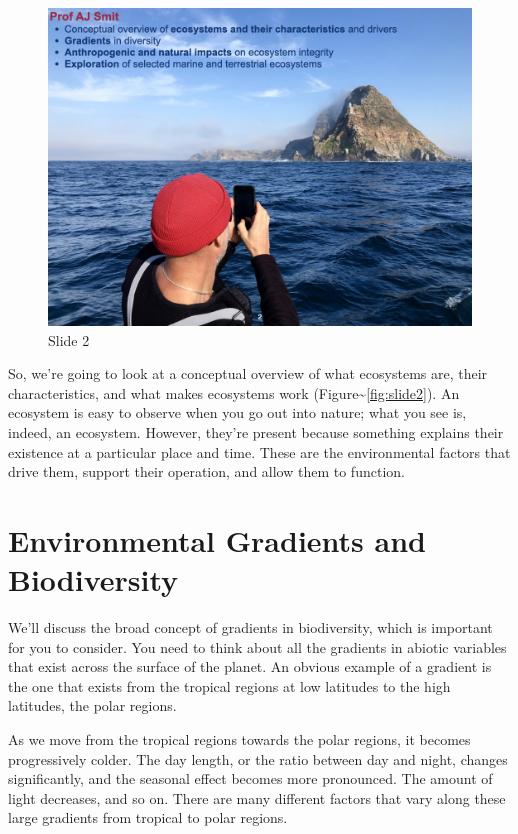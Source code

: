 \documentclass[
  10pt,
]{book}
\begin{document}
\begin{figure}[ht]
\centering
\includegraphics[width=0.8\linewidth]{../images/BDC334/BDC334-002.jpeg}
\caption*{Slide 2}\label{fig:slide2}
\end{figure}

So, we're going to look at a conceptual overview of what ecosystems are,
their characteristics, and what makes ecosystems work
(Figure\textasciitilde{}\autoref{fig:slide2}). An ecosystem is easy to
observe when you go out into nature; what you see is, indeed, an
ecosystem. However, they're present because something explains their
existence at a particular place and time. These are the environmental
factors that drive them, support their operation, and allow them to
function.

\section{Environmental Gradients and
Biodiversity}\label{environmental-gradients-and-biodiversity}

We'll discuss the broad concept of gradients in biodiversity, which is
important for you to consider. You need to think about all the gradients
in abiotic variables that exist across the surface of the planet. An
obvious example of a gradient is the one that exists from the tropical
regions at low latitudes to the high latitudes, the polar regions.

As we move from the tropical regions towards the polar regions, it
becomes progressively colder. The day length, or the ratio between day
and night, changes significantly, and the seasonal effect becomes more
pronounced. The amount of light decreases, and so on. There are many
different factors that vary along these large gradients from tropical to
polar regions.
\end{document}
